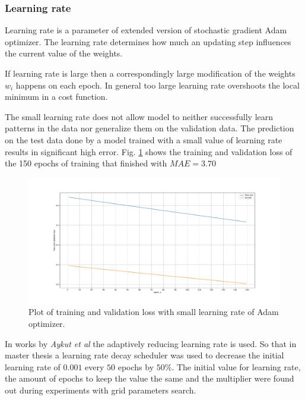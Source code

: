 \subsubsection{Learning rate}
\label{sec:eval:experiments:early:lr}
Learning rate is a parameter of extended version of stochastic gradient Adam optimizer. The learning rate determines how much an updating step influences the current value of the weights. 

If learning rate is large then a correspondingly large modification of the weights $w_i$ happens on each epoch. In general too large learning rate overshoots the local minimum in a cost function.

The small learning rate does not allow model to neither successfully learn patterns in the data nor generalize them on the validation data. The prediction on the test data done by a model trained with a small value of learning rate results in significant high error. Fig. \ref{fig:lr} shows the training and validation loss of the 150 epochs of training that finished with $MAE = 3.70$
\begin{figure}[htb]
	\begin{center}
		\includegraphics[width=1\textwidth, keepaspectratio]{gfx/lstm1_lr_low.pdf}
		\caption{\label{fig:lr} Plot of training and validation loss with small learning rate of Adam optimizer.}
	\end{center}
\end{figure}

In works \cite{delay_compensation_360, telepresence} by \textit{Aykut et al} the adaptively reducing learning rate is used. So that in master thesis a learning rate decay scheduler was used to decrease the initial learning rate of $0.001$ every $50$ epochs by $50\%$. The initial value for learning rate, the amount of epochs to keep the value the same and the multiplier were found out during experiments with grid parameters search. 

